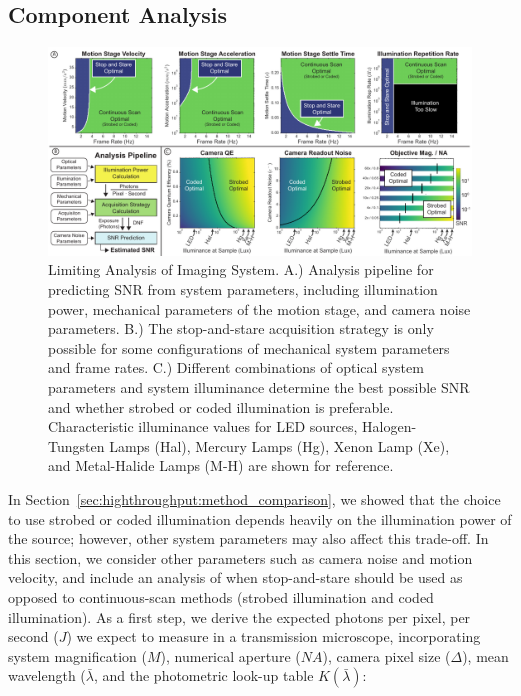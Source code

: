 \subsection{Component Analysis}\label{sec:highthroughput:component_analysis}

\begin{figure}
  \centering
    \includegraphics[width=1.0\textwidth]{figures/fig_highthroughput_component_analysis.pdf}
      \caption{\label{fig:component_analysis} Limiting Analysis of Imaging System. A.) Analysis pipeline for predicting SNR from system parameters, including illumination power, mechanical parameters of the motion stage, and camera noise parameters. B.) The stop-and-stare acquisition strategy is only possible for some configurations of mechanical system parameters and frame rates. C.) Different combinations of optical system parameters and system illuminance determine the best possible SNR and whether strobed or coded illumination is preferable. Characteristic illuminance values for LED sources, Halogen-Tungsten Lamps (Hal), Mercury Lamps (Hg), Xenon Lamp (Xe), and Metal-Halide Lamps (M-H) are shown for reference. }
\end{figure}

In Section~\ref{sec:highthroughput:method_comparison}, we showed that the choice to use strobed or coded illumination depends heavily on the illumination power of the source; however, other system parameters may also affect this trade-off. In this section, we consider other parameters such as camera noise and motion velocity, and include an analysis of when stop-and-stare should be used as opposed to continuous-scan methods (strobed illumination and coded illumination). As a first step, we derive the expected photons per pixel, per second ($J$) we expect to measure in a transmission microscope, incorporating system magnification ($M$), numerical aperture ($NA$), camera pixel size ($\Delta$), mean wavelength ($\bar{\lambda}$, and the photometric look-up table $K(\bar{\lambda})$:

